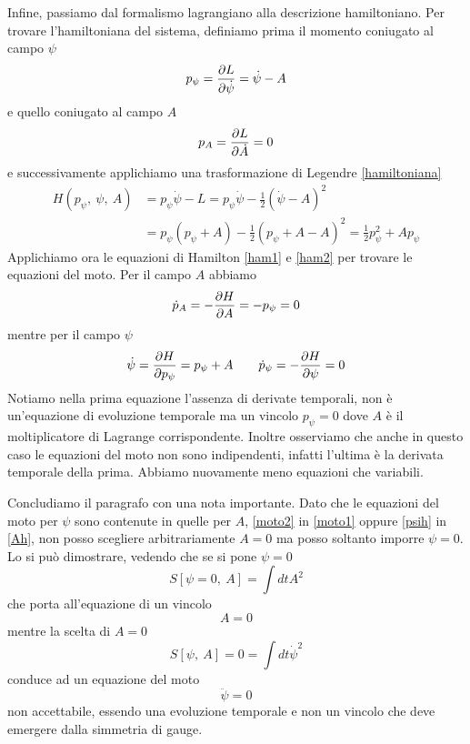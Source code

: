     Infine, passiamo dal formalismo lagrangiano alla descrizione hamiltoniano. Per trovare l'hamiltoniana del sistema, definiamo prima il momento coniugato al campo $\psi$
\begin{equation*}
    p_\psi = \frac{\partial L}{\partial\dot \psi} = \dot \psi - A
\end{equation*}
    e quello coniugato al campo $A$
\begin{equation*}
    p_A = \frac{\partial L}{\partial\dot A} = 0
\end{equation*}
    e successivamente applichiamo una trasformazione di Legendre \eqref{hamiltoniana}
\begin{equation*}
\begin{aligned}
    H(p_\psi,~\psi,~A) & = p_\psi \dot \psi - L = p_\psi \dot \psi - \frac{1}{2} (\dot \psi - A)^2 \\ & = p_\psi (p_\psi + A) - \frac{1}{2} (p_\psi + A - A)^2 = \frac{1}{2} p^2_\psi  + A p_\psi
\end{aligned}
\end{equation*}
    Applichiamo ora le equazioni di Hamilton \eqref{ham1} e \eqref{ham2} per trovare le equazioni del moto. Per il campo $A$ abbiamo
\begin{equation} \label{Ah}
    \dot p_A = - \frac{\partial H}{\partial A} = - p_\psi = 0 
\end{equation}
    mentre per il campo $\psi$
\begin{equation} \label{psih}
    \dot \psi = \frac{\partial H}{\partial p_\psi} = p_\psi + A \qquad \dot p_\psi = - \frac{\partial H}{\partial\psi} = 0
\end{equation}
    Notiamo nella prima equazione l'assenza di derivate temporali, non è un'equazione di evoluzione temporale ma un vincolo $p_\psi = 0$ dove $A$ è il moltiplicatore di Lagrange corrispondente. Inoltre osserviamo che anche in questo caso le equazioni del moto non sono indipendenti, infatti l'ultima è la derivata temporale della prima. Abbiamo nuovamente meno equazioni che variabili.

    Concludiamo il paragrafo con una nota importante. Dato che le equazioni del moto per $\psi$ sono contenute in quelle per $A$, \eqref{moto2} in \eqref{moto1} oppure \eqref{psih} in \eqref{Ah}, non posso scegliere arbitrariamente $A = 0$ ma posso soltanto imporre $\psi = 0$. Lo si può dimostrare, vedendo che se si pone $\psi = 0$ 
\begin{equation*}
    S[\psi = 0,~A] = \int dt A^2
\end{equation*}
    che porta all'equazione di un vincolo
\begin{equation*}
    A = 0
\end{equation*}
    mentre la scelta di $A = 0$ 
\begin{equation*}
    S[\psi,~A]=0 = \int dt \dot \psi^2
\end{equation*}
    conduce ad un equazione del moto 
\begin{equation*}
    \ddot \psi = 0
\end{equation*}
    non accettabile, essendo una evoluzione temporale e non un vincolo che deve emergere dalla simmetria di gauge. 

